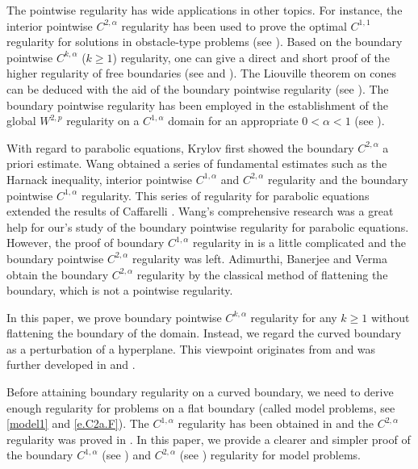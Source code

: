 \documentclass[preprint,12pt]{elsarticle}
\theoremstyle{definition}
\theoremstyle{remark}
\numberwithin{equation}{section}
\begin{document}
The pointwise regularity has wide applications in other topics. For instance, the interior pointwise $C^{2,\alpha}$ regularity has been used to prove the optimal $C^{1,1}$ regularity for solutions in obstacle-type problems (see \cite[Proof of Theorem 1.2]{MR3198649}). Based on the boundary pointwise $C^{k,\alpha}$ ($k\geq 1$) regularity, one can give a direct and short proof of the higher regularity of free boundaries (see \cite{freeboundary} and ). The Liouville theorem on cones can be deduced with the aid of the boundary pointwise regularity (see \cite{MR_cones}). The boundary pointwise regularity has been employed in the establishment of the global $W^{2,p}$ regularity on a $C^{1,\alpha}$ domain for an appropriate $0<\alpha<1$ (see \cite{MR_LiLiZhang}).

With regard to parabolic equations, Krylov \cite{MR688919} first showed the boundary $C^{2,\alpha}$ a priori estimate. Wang \cite{MR1135923,MR1139064,MR1151267} obtained a series of fundamental estimates such as the Harnack inequality, interior pointwise $C^{1,\alpha}$ and $C^{2,\alpha}$ regularity and the boundary pointwise $C^{1,\alpha}$ regularity. This series of regularity for parabolic equations extended the results of Caffarelli \cite{MR1005611}. Wang's comprehensive research was a great help for our's study of the boundary pointwise regularity for parabolic equations. However, the proof of boundary $C^{1,\alpha}$ regularity in \cite{MR1139064} is a little complicated and the boundary pointwise $C^{2,\alpha}$ regularity was left. Adimurthi, Banerjee and Verma \cite{MR4073515} obtain the boundary $C^{2,\alpha}$ regularity by the classical method of flattening the boundary, which is not a pointwise regularity.


In this paper, we prove boundary pointwise $C^{k,\alpha}$ regularity for any $k\geq 1$ without flattening the boundary of the domain. Instead, we regard the curved boundary as a perturbation of a hyperplane. This viewpoint originates from \cite{MR3780142} and was further developed in \cite{MR4088470} and \cite{lian2020pointwise}.

Before attaining boundary regularity on a curved boundary, we need to derive enough regularity for problems on a flat boundary (called model problems, see \cref{model1} and \cref{e.C2a.F}). The $C^{1,\alpha}$ regularity has been obtained in \cite{MR1139064} and the $C^{2,\alpha}$ regularity was proved in \cite{MR4073515}. In this paper, we provide a clearer and simpler proof of the boundary $C^{1,\alpha}$ (see ) and $C^{2,\alpha}$ (see ) regularity for model problems.
\end{document}
